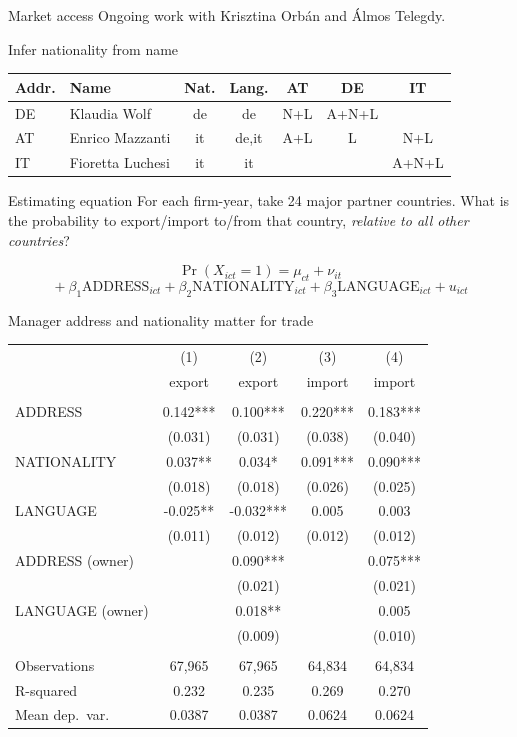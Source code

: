 \documentclass[
  ignorenonframetext,
  aspectratio=43,
]{beamer}
\begin{document}
\begin{frame}{Market access}
\protect\hypertarget{market-access-1}{}
Ongoing work with Krisztina Orbán and Álmos Telegdy.
\end{frame}

\begin{frame}{Infer nationality from name}
\protect\hypertarget{infer-nationality-from-name}{}
\begin{tabular}{llcc|ccc}
Addr. & Name & Nat. & Lang. & AT & DE & IT\\
\hline
DE & Klaudia Wolf & de & de         & N+L & A+N+L & \\
AT & Enrico Mazzanti & it & de,it   & A+L & L & N+L\\
IT & Fioretta Luchesi & it & it     & & & A+N+L
\end{tabular}
\end{frame}

\begin{frame}{Estimating equation}
\protect\hypertarget{estimating-equation}{}
For each firm-year, take 24 major partner countries. What is the
probability to export/import to/from that country, \emph{relative to all
other countries}?

\[
\Pr(X_{ict}=1) = 
\mu_{ct} + \nu_{it} 
\] \[
{}+ \beta_1 \text{ADDRESS}_{ict} 
{}+ \beta_2 \text{NATIONALITY}_{ict} 
{}+ \beta_3 \text{LANGUAGE}_{ict} 
{}+ u_{ict}
\]
\end{frame}

\begin{frame}{Manager address and nationality matter for trade}
\protect\hypertarget{manager-address-and-nationality-matter-for-trade}{}
\begin{tabular}{lcccc} \hline
& (1) & (2) & (3) & (4) \\
& export & export & import & import \\ \hline
&  &  &  &  \\
ADDRESS & 0.142*** & 0.100*** & 0.220*** & 0.183*** \\
& (0.031) & (0.031) & (0.038) & (0.040) \\
NATIONALITY & 0.037** & 0.034* & 0.091*** & 0.090*** \\
& (0.018) & (0.018) & (0.026) & (0.025) \\
LANGUAGE & -0.025** & -0.032*** & 0.005 & 0.003 \\
& (0.011) & (0.012) & (0.012) & (0.012) \\
ADDRESS (owner) &  & 0.090*** &  & 0.075*** \\
&  & (0.021) &  & (0.021) \\
LANGUAGE (owner) &  & 0.018** &  & 0.005 \\
&  & (0.009) &  & (0.010) \\
&  &  &  &  \\
Observations & 67,965 & 67,965 & 64,834 & 64,834 \\
R-squared & 0.232 & 0.235 & 0.269 & 0.270 \\
Mean dep.~var.& 0.0387 & 0.0387 & 0.0624 & 0.0624 \\ \hline
\end{tabular}
\end{frame}
\end{document}
